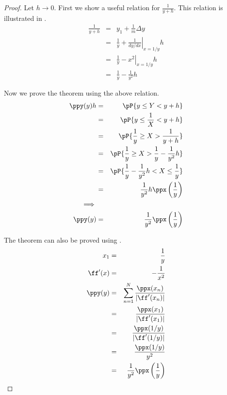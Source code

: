 \begin{proof}
Let $h\to0$.
First we show a useful relation for $\frac{1}{y+h}$.
This relation is illustrated in .
\begin{eqnarray*}
  \frac{1}{y+h}
    &=&    y_1 + \frac{1}{m} \Delta y
  \\&=&    \frac{1}{y} + \left.\frac{1}{dy/dx}\right|_{x=1/y} h
  \\&=&    \frac{1}{y} - \left.x^2\right|_{x=1/y} h
  \\&=&    \frac{1}{y} - \frac{1}{y^2} h
\end{eqnarray*}

Now we prove the theorem using the above relation.
\begin{eqnarray*}
  \ppy(y)h
    &=&    \pP{y\le Y < y+h}
  \\&=&    \pP{y\le \frac{1}{X} < y+h}
  \\&=&    \pP{\frac{1}{y}\ge X > \frac{1}{y+h}}
  \\&=&    \pP{\frac{1}{y}\ge X > \frac{1}{y}-\frac{1}{y^2}h}
  \\&=&    \pP{\frac{1}{y}-\frac{1}{y^2}h <  X \le \frac{1}{y} }
  \\&=&    \frac{1}{y^2}h \ppx\left( \frac{1}{y} \right)
\\\implies
\\
  \ppy(y)
    &=&    \frac{1}{y^2} \ppx\left( \frac{1}{y} \right)
\end{eqnarray*}

The theorem can also be proved using .
\begin{eqnarray*}
  x_1 &=& \frac{1}{y} \\
  \ff'(x) &=& -\frac{1}{x^2}    \\
  \ppy(y)
    &=& \sum_{n=1}^N \frac{\ppx(x_n)}{|\ff'(x_n)|}
  \\&=& \frac{\ppx(x_1)}{|\ff'(x_1)|}
  \\&=& \frac{\ppx(1/y)}{|\ff'(1/y)|}
  \\&=& \frac{\ppx(1/y)}{y^2}
  \\&=& \frac{1}{y^2} \ppx\left( \frac{1}{y} \right)
\end{eqnarray*}
\end{proof}





